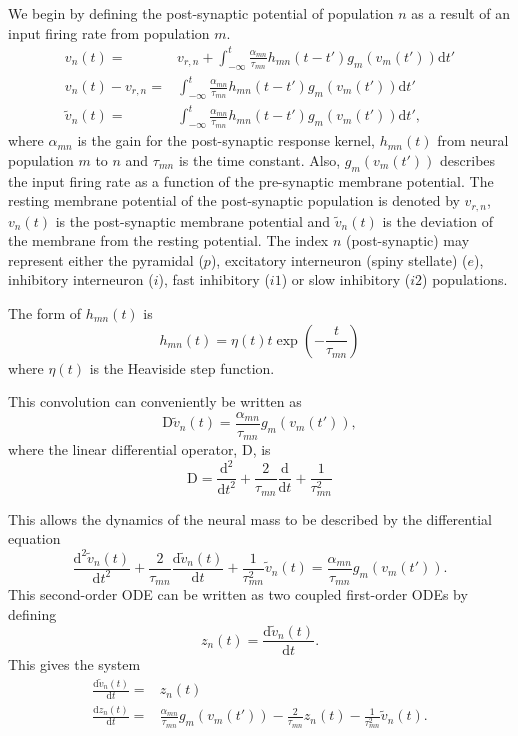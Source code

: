 \documentclass[]{article}
\begin{document}
We begin by defining the post-synaptic potential of population $n$ as a result of an input firing rate from population $m$.
\begin{align}
	v_n(t) =& v_{r,n} + \int_{-\infty}^t \frac{\alpha_{mn}}{\tau_{mn}} h_{mn}(t-t')g_m(v_m(t')) \mathrm{d}t' \\
	v_n(t) - v_{r,n} =& \int_{-\infty}^t \frac{\alpha_{mn}}{\tau_{mn}} h_{mn}(t-t')g_m(v_m(t')) \mathrm{d}t' \\
	\tilde v_n(t) =& \int_{-\infty}^t \frac{\alpha_{mn}}{\tau_{mn}} h_{mn}(t-t')g_m(v_m(t')) \mathrm{d}t',
\end{align}
where $\alpha_{mn}$ is the gain for the post-synaptic response kernel, $h_{mn}(t)$ from neural population $m$ to $n$ and $\tau_{mn}$ is the time constant. Also, $g_m(v_m(t'))$ describes the input firing rate as a function of the pre-synaptic membrane potential. The resting membrane potential of the post-synaptic population is denoted by $v_{r,n}$, $v_n(t)$ is the post-synaptic membrane potential and $\tilde v_n(t)$ is the deviation of the membrane from the resting potential. The index $n$ (post-synaptic) may represent either the pyramidal ($p$), excitatory interneuron (spiny stellate) ($e$), inhibitory interneuron ($i$), fast inhibitory ($i1$) or slow inhibitory ($i2$) populations.  

The form of $h_{mn}(t)$ is 
\begin{equation}
	h_{mn}(t) = \eta(t)t\exp\left(-\frac{t}{\tau_{mn}}\right)
\end{equation}
where $\eta(t)$ is the Heaviside step function.

This convolution can conveniently be written as 
\begin{equation}
	\mathrm{D}\tilde v_n(t) = \frac{\alpha_{mn}}{\tau_{mn}} g_m(v_m(t')),
\end{equation}
where the linear differential operator, $\mathrm{D}$, is
\begin{equation}
	\mathrm{D} = \frac{\mathrm{d}^2}{\mathrm{d}t^2} + \frac{2}{\tau_{mn}}\frac{\mathrm{d}}{\mathrm{d}t} + \frac{1}{\tau_{mn}^2}
\end{equation}

This allows the dynamics of the neural mass to be described by the differential equation
\begin{equation}
	\frac{\mathrm{d}^2\tilde v_n(t)}{\mathrm{d}t^2} + \frac{2}{\tau_{mn}}\frac{\mathrm{d}\tilde v_n(t)}{\mathrm{d}t} + \frac{1}{\tau_{mn}^2}\tilde v_n(t) = \frac{\alpha_{mn}}{\tau_{mn}} g_m(v_m(t')).
\end{equation}
This second-order ODE can be written as two coupled first-order ODEs by defining
\begin{equation}
	z_n(t) = \frac{\mathrm{d}\tilde v_n(t)}{\mathrm{d}t}.
\end{equation}
This gives the system
\begin{align}
	\frac{\mathrm{d}\tilde v_n(t)}{\mathrm{d}t} =& z_n(t) \\
	\frac{\mathrm{d}z_n(t)}{\mathrm{d}t} =& \frac{\alpha_{mn}}{\tau_{mn}} g_m(v_m(t')) - \frac{2}{\tau_{mn}}z_n(t) - \frac{1}{\tau_{mn}^2}\tilde v_n(t).
\end{align}
\end{document}
